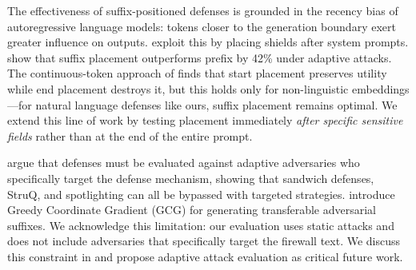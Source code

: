 The effectiveness of suffix-positioned defenses is grounded in the recency bias of autoregressive language models: tokens closer to the generation boundary exert greater influence on outputs.
\citet{jawad2026psm} exploit this by placing shields after system prompts.
\citet{xiong2025dpp} show that suffix placement outperforms prefix by 42\% under adaptive attacks.
The continuous-token approach of \citet{yuan2025defensive} finds that start placement preserves utility while end placement destroys it, but this holds only for non-linguistic embeddings---for natural language defenses like ours, suffix placement remains optimal.
We extend this line of work by testing placement immediately \emph{after specific sensitive fields} rather than at the end of the entire prompt.

\citet{tramer2025attacker} argue that defenses must be evaluated against adaptive adversaries who specifically target the defense mechanism, showing that sandwich defenses, StruQ, and spotlighting can all be bypassed with targeted strategies.
\citet{zou2023universal} introduce Greedy Coordinate Gradient (GCG) for generating transferable adversarial suffixes.
We acknowledge this limitation: our evaluation uses static attacks and does not include adversaries that specifically target the firewall text.
We discuss this constraint in  and propose adaptive attack evaluation as critical future work.
